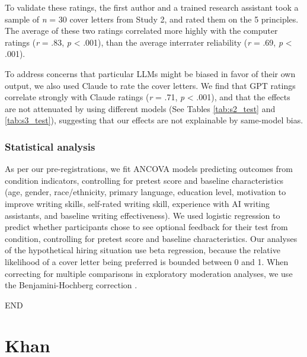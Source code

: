 \documentclass[11pt]{report}
\begin{document}
\begin{mainf}
To validate these ratings, the first author and a trained research assistant took a sample of \textit{n} = 30 cover letters from Study 2, and rated them on the 5 principles. The average of these two ratings correlated more highly with the computer ratings (\textit{r} = .83, \textit{p} < .001), than the average interrater reliability (\textit{r} = .69, \textit{p} < .001).

To address concerns that particular LLMs might be biased in favor of their own output, we also used Claude to rate the cover letters. We find that GPT ratings correlate strongly with Claude ratings (\textit{r} = .71, \textit{p} < .001), and that the effects are not attenuated by using different models (See Tables \ref{tab:s2_test} and \ref{tab:s3_test}), suggesting that our effects are not explainable by same-model bias.

\subsection{Statistical analysis}
As per our pre-registrations, we fit ANCOVA models predicting outcomes from condition indicators, controlling for pretest score and baseline characteristics (age, gender, race/ethnicity, primary language, education level, motivation to improve writing skills, self-rated writing skill, experience with AI writing assistants, and baseline writing effectiveness). We used logistic regression to predict whether participants chose to see optional feedback for their test from condition, controlling for pretest score and baseline characteristics. 
Our analyses of the hypothetical hiring situation use beta regression, because the relative likelihood of a cover letter being preferred is bounded between 0 and 1.
When correcting for multiple comparisons in exploratory moderation analyses, we use the Benjamini-Hochberg correction \cite{benjamini1995controlling}. 


END


\chapter{Khan}


\end{mainf}
\end{document}
